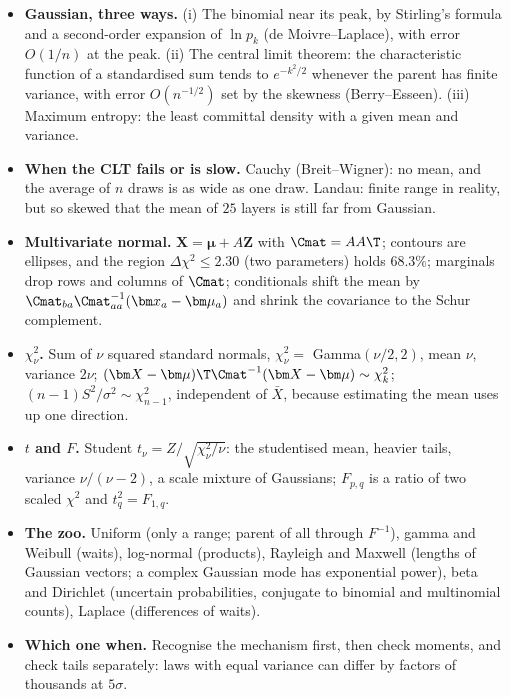 \begin{recap}
\begin{itemize}
  \item \textbf{Gaussian, three ways.} (i) The binomial near its peak, by Stirling's formula and a second-order expansion of $\ln p_k$ (de Moivre--Laplace), with error $O(1/n)$ at the peak. (ii) The central limit theorem: the characteristic function of a standardised sum tends to $e^{-k^2/2}$ whenever the parent has finite variance, with error $O(n^{-1/2})$ set by the skewness (Berry--Esseen). (iii) Maximum entropy: the least committal density with a given mean and variance.
  \item \textbf{When the CLT fails or is slow.} Cauchy (Breit--Wigner): no mean, and the average of $n$ draws is as wide as one draw. Landau: finite range in reality, but so skewed that the mean of $25$ layers is still far from Gaussian.
  \item \textbf{Multivariate normal.} $\bm X=\bm\mu+A\bm Z$ with $\Cmat=AA\T$; contours are ellipses, and the region $\Delta\chi^2\le2.30$ (two parameters) holds $68.3\%$; marginals drop rows and columns of $\Cmat$; conditionals shift the mean by $\Cmat_{ba}\Cmat_{aa}^{-1}(\bm x_a-\bm\mu_a)$ and shrink the covariance to the Schur complement.
  \item \textbf{$\chi^2_\nu$.} Sum of $\nu$ squared standard normals, $\chi^2_\nu=$ Gamma$(\nu/2,2)$, mean $\nu$, variance $2\nu$; $(\bm X-\bm\mu)\T\Cmat^{-1}(\bm X-\bm\mu)\sim\chi^2_k$; $(n-1)S^2/\sigma^2\sim\chi^2_{n-1}$, independent of $\bar X$, because estimating the mean uses up one direction.
  \item \textbf{$t$ and $F$.} Student $t_\nu=Z/\sqrt{\chi^2_\nu/\nu}$: the studentised mean, heavier tails, variance $\nu/(\nu-2)$, a scale mixture of Gaussians; $F_{p,q}$ is a ratio of two scaled $\chi^2$ and $t_q^2=F_{1,q}$.
  \item \textbf{The zoo.} Uniform (only a range; parent of all through $F^{-1}$), gamma and Weibull (waits), log-normal (products), Rayleigh and Maxwell (lengths of Gaussian vectors; a complex Gaussian mode has exponential power), beta and Dirichlet (uncertain probabilities, conjugate to binomial and multinomial counts), Laplace (differences of waits).
  \item \textbf{Which one when.} Recognise the mechanism first, then check moments, and check tails separately: laws with equal variance can differ by factors of thousands at $5\sigma$.
\end{itemize}
\end{recap}

